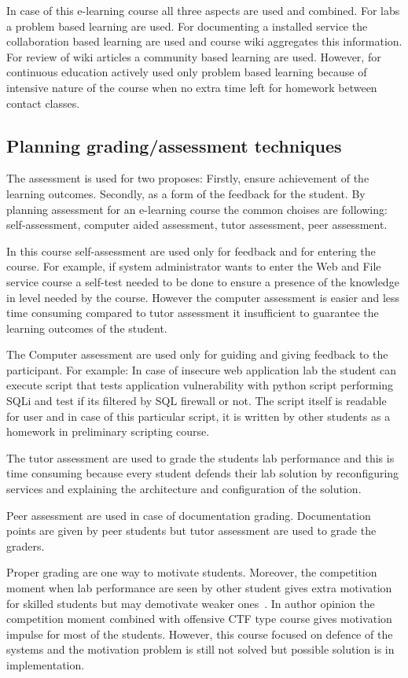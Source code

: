 In case of this e-learning course all three aspects are used and combined.
For labs a problem based learning are used. For documenting a installed service the collaboration based learning are used and course wiki aggregates this information. For review of wiki articles a community based learning are used. However, for continuous education actively used only problem based learning because of intensive nature of the course when no extra time left for homework between contact classes.

\subsection{Planning grading/assessment techniques}
The assessment is used for two proposes: Firstly, ensure achievement of the learning outcomes. Secondly, as a form of the feedback for the student. By planning assessment for an e-learning course the common choises are following: self-assessment, computer aided assessment, tutor assessment, peer assessment. ~\citep{OppeArenduskeskus2010}

In this course self-assessment are used only for feedback and for entering the course. For example, if system administrator wants to enter the Web and File service course a self-test needed to be done to ensure a presence of the knowledge in level needed by the course. However the computer assessment is easier and less time consuming compared to tutor assessment it insufficient to guarantee the learning outcomes of the student. 

The Computer assessment are used only for guiding and giving feedback to the participant. For example: In case of insecure web application lab the student can execute script that tests application vulnerability with python script performing \gls{SQLi} and test if its filtered by \gls{SQL} firewall or not. The script itself is readable for user and in case of this particular script, it is written by other students as a homework in preliminary scripting course.


The tutor assessment are used to grade the students lab performance and this is time consuming because every student defends their lab solution by reconfiguring services and explaining the architecture and configuration of the solution.

Peer assessment are used in case of documentation grading. Documentation points are given by peer students but tutor assessment are used to grade the graders.

Proper grading are one way to motivate students. Moreover, the competition moment when lab performance are seen by other student gives extra motivation for skilled students but may demotivate weaker ones~\citep{KasakKaur}. In author opinion the competition moment combined with offensive \gls{CTF} type course gives motivation impulse for most of the students. However, this course focused on defence of the systems and the motivation problem is still not solved but possible solution is in implementation.

